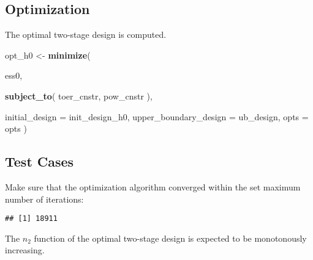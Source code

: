 \documentclass[
]{book}
\newenvironment{Shaded}{\begin{snugshade}}{\end{snugshade}}
\newcommand{\DataTypeTok}[1]{\textcolor[rgb]{0.13,0.29,0.53}{#1}}
\newcommand{\KeywordTok}[1]{\textcolor[rgb]{0.13,0.29,0.53}{\textbf{#1}}}
\newcommand{\NormalTok}[1]{#1}
\newcommand{\OperatorTok}[1]{\textcolor[rgb]{0.81,0.36,0.00}{\textbf{#1}}}
\newcommand{\StringTok}[1]{\textcolor[rgb]{0.31,0.60,0.02}{#1}}
\begin{document}
\hypertarget{optimization-1}{%
\subsection{Optimization}\label{optimization-1}}

The optimal two-stage design is computed.

\begin{Shaded}
\begin{Highlighting}[]
\NormalTok{opt\_h0 \textless{}{-}}\StringTok{ }\KeywordTok{minimize}\NormalTok{(}
  
\NormalTok{    ess0,}
    
    \KeywordTok{subject\_to}\NormalTok{(}
\NormalTok{        toer\_cnstr,}
\NormalTok{        pow\_cnstr}
\NormalTok{    ),}
    
    \DataTypeTok{initial\_design        =}\NormalTok{ init\_design\_h0,}
    \DataTypeTok{upper\_boundary\_design =}\NormalTok{ ub\_design,}
    \DataTypeTok{opts =}\NormalTok{ opts )}
\end{Highlighting}
\end{Shaded}

\hypertarget{test-cases-1}{%
\subsection{Test Cases}\label{test-cases-1}}

Make sure that the optimization algorithm converged within the set
maximum number of iterations:

\begin{Shaded}
\end{Shaded}

\begin{verbatim}
## [1] 18911
\end{verbatim}

The \(n_2\) function of the optimal two-stage design is expected to be
monotonously increasing.
\end{document}
